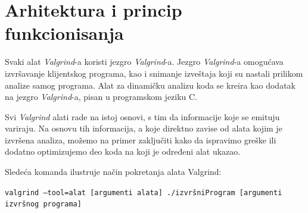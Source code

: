 \documentclass[12pt,oneside]{memoir}
\theoremstyle{plain}
\theoremstyle{definition}
\begin{document}
\section{Arhitektura i princip funkcionisanja}

Svaki alat \textit{Valgrind}-a koristi jezgro \textit{Valgrind}-a. Jezgro \textit{Valgrind}-a omogućava izvršavanje klijentskog programa, kao i snimanje izveštaja koji su nastali prilikom analize samog programa. Alat za dinamičku analizu koda se kreira kao dodatak na jezgro \textit{Valgrind}-a, pisan u programskom jeziku C.


Svi \textit{Valgrind} alati rade na istoj osnovi, s tim da informacije koje se emituju variraju. Na osnovu tih informacija, a koje direktno zavise od alata kojim je izvršena analiza, možemo na primer zaključiti kako da ispravimo greške ili dodatno optimizujemo deo koda na koji je određeni alat ukazao. %

Sledeća komanda ilustruje način pokretanja alata Valgrind:
\begin{center}
\texttt{valgrind --tool=alat [argumenti alata] ./izvršniProgram [argumenti izvršnog programa]}
\end{center}
\end{document}
